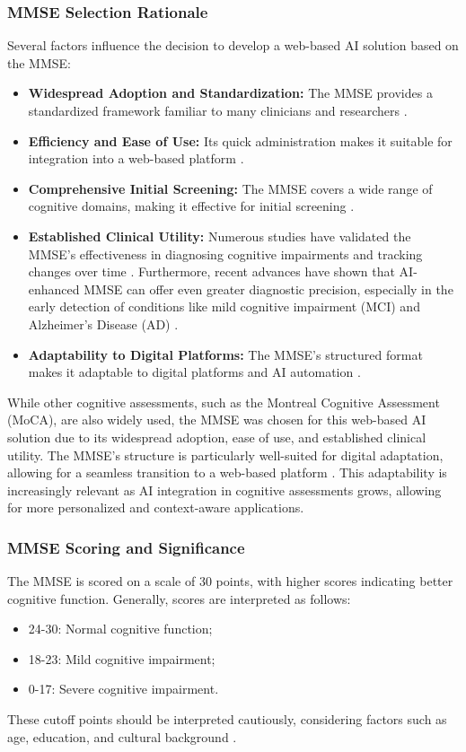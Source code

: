 \subsubsection{MMSE Selection Rationale}
Several factors influence the decision to develop a web-based AI solution based on the MMSE:
\begin{itemize}
    \item \textbf{Widespread Adoption and Standardization:} The MMSE provides a standardized framework familiar to many clinicians and researchers \cite{Folstein1975, Crum1993}.
    \item \textbf{Efficiency and Ease of Use:} Its quick administration makes it suitable for integration into a web-based platform \cite{Tombaugh1992}.
    \item \textbf{Comprehensive Initial Screening:} The MMSE covers a wide range of cognitive domains, making it effective for initial screening \cite{Tombaugh1992}.
    \item \textbf{Established Clinical Utility:} Numerous studies have validated the MMSE's effectiveness in diagnosing cognitive impairments and tracking changes over time \cite{Salmon1990, Mitchell2009}. Furthermore, recent advances have shown that AI-enhanced MMSE can offer even greater diagnostic precision, especially in the early detection of conditions like mild cognitive impairment (MCI) and Alzheimer’s Disease (AD) \cite{Formica2023}.
    \item \textbf{Adaptability to Digital Platforms:} The MMSE's structured format makes it adaptable to digital platforms and AI automation \cite{Zygouris2017}.
\end{itemize}

While other cognitive assessments, such as the Montreal Cognitive Assessment (MoCA), are also widely used, the MMSE was chosen for this web-based AI solution due to its widespread adoption, ease of use, and established clinical utility. The MMSE’s structure is particularly well-suited for digital adaptation, allowing for a seamless transition to a web-based platform \cite{Peng2020}. This adaptability is increasingly relevant as AI integration in cognitive assessments grows, allowing for more personalized and context-aware applications.


\subsubsection{MMSE Scoring and Significance}
The MMSE is scored on a scale of 30 points, with higher scores indicating better cognitive function. Generally, scores are interpreted as follows:
\begin{itemize}
    \item 24-30: Normal cognitive function;
    \item 18-23: Mild cognitive impairment;
    \item 0-17: Severe cognitive impairment.
\end{itemize}
These cutoff points should be interpreted cautiously, considering factors such as age, education, and cultural background \cite{Kukull1994}.

